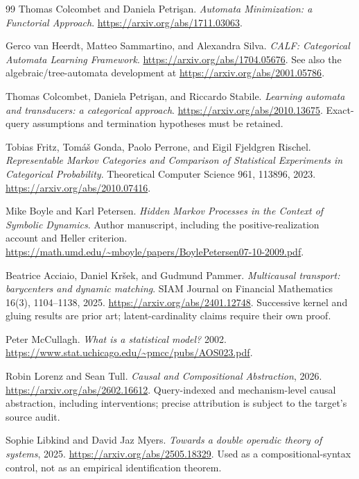 \documentclass[11pt]{article}
\theoremstyle{remark}
\begin{document}
\begin{thebibliography}{99}
Thomas Colcombet and Daniela Petri\c{s}an.
\emph{Automata Minimization: a Functorial Approach}.
\url{https://arxiv.org/abs/1711.03063}.

Gerco van Heerdt, Matteo Sammartino, and Alexandra Silva.
\emph{CALF: Categorical Automata Learning Framework}.
\url{https://arxiv.org/abs/1704.05676}.
See also the algebraic/tree-automata development at
\url{https://arxiv.org/abs/2001.05786}.

Thomas Colcombet, Daniela Petri\c{s}an, and Riccardo Stabile.
\emph{Learning automata and transducers: a categorical approach}.
\url{https://arxiv.org/abs/2010.13675}.
Exact-query assumptions and termination hypotheses must be retained.

Tobias Fritz, Tom\'a\v{s} Gonda, Paolo Perrone, and Eigil Fjeldgren Rischel.
\emph{Representable Markov Categories and Comparison of Statistical Experiments in Categorical Probability}.
Theoretical Computer Science 961, 113896, 2023.
\url{https://arxiv.org/abs/2010.07416}.

Mike Boyle and Karl Petersen.
\emph{Hidden Markov Processes in the Context of Symbolic Dynamics}.
Author manuscript, including the positive-realization account and Heller criterion.
\url{https://math.umd.edu/~mboyle/papers/BoylePetersen07-10-2009.pdf}.

Beatrice Acciaio, Daniel Kr\v{s}ek, and Gudmund Pammer.
\emph{Multicausal transport: barycenters and dynamic matching}.
SIAM Journal on Financial Mathematics 16(3), 1104--1138, 2025.
\url{https://arxiv.org/abs/2401.12748}.
Successive kernel and gluing results are prior art; latent-cardinality claims require their own proof.

Peter McCullagh. \emph{What is a statistical model?} 2002.
\url{https://www.stat.uchicago.edu/~pmcc/pubs/AOS023.pdf}.

Robin Lorenz and Sean Tull. \emph{Causal and Compositional Abstraction}, 2026.
\url{https://arxiv.org/abs/2602.16612}.
Query-indexed and mechanism-level causal abstraction, including interventions; precise attribution is subject to the target's source audit.

Sophie Libkind and David Jaz Myers. \emph{Towards a double operadic theory of systems}, 2025.
\url{https://arxiv.org/abs/2505.18329}.
Used as a compositional-syntax control, not as an empirical identification theorem.


\end{thebibliography}
\end{document}
